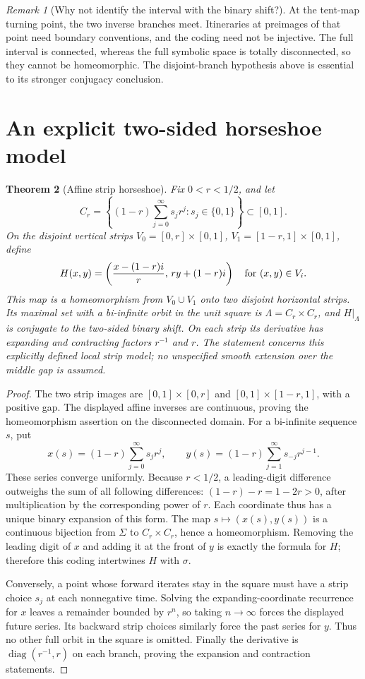 \documentclass[11pt,oneside]{book}
\newtheorem{theorem}{Theorem}[chapter]
\theoremstyle{definition}
\theoremstyle{remark}\newtheorem{remark}[theorem]{Remark}
\begin{document}
\begin{remark}[Why not identify the interval with the binary shift?]
At the tent-map turning point, the two inverse branches meet.
Itineraries at preimages of that point need boundary conventions,
and the coding need not be injective. The full interval is connected,
whereas the full symbolic space is totally disconnected, so they
cannot be homeomorphic. The disjoint-branch hypothesis above is
essential to its stronger conjugacy conclusion.
\end{remark}

\section{An explicit two-sided horseshoe model}

\begin{theorem}[Affine strip horseshoe]\label{d13:17:affine-horseshoe}
Fix \(0<r<1/2\), and let
\[
 C_r=\left\{(1-r)\sum_{j=0}^\infty s_jr^j:
                       s_j\in\{0,1\}\right\}\subset[0,1].
\]
On the disjoint vertical strips
\(V_0=[0,r]\times[0,1]\),
\(V_1=[1-r,1]\times[0,1]\), define
\[
 H(x,y)=\left(\frac{x-(1-r)i}{r},\,ry+(1-r)i\right)
             \quad\hbox{for }(x,y)\in V_i .
\]
This map is a homeomorphism from \(V_0\cup V_1\) onto two disjoint
horizontal strips. Its maximal set with a bi-infinite orbit in the
unit square is \(\Lambda=C_r\times C_r\), and \(H|_\Lambda\) is
conjugate to the two-sided binary shift. On each strip its derivative
has expanding and contracting factors \(r^{-1}\) and \(r\).
The statement concerns this explicitly defined local strip model;
no unspecified smooth extension over the middle gap is assumed.
\end{theorem}
\begin{proof}
The two strip images are
\([0,1]\times[0,r]\) and
\([0,1]\times[1-r,1]\), with a positive gap.
The displayed affine inverses are continuous, proving
the homeomorphism assertion on the disconnected domain.
For a bi-infinite sequence \(s\), put
\[
 x(s)=(1-r)\sum_{j=0}^\infty s_jr^j,\qquad
 y(s)=(1-r)\sum_{j=1}^\infty s_{-j}r^{j-1}.
\]
These series converge uniformly. Because \(r<1/2\), a leading-digit
difference outweighs the sum of all following differences:
\((1-r)-r=1-2r>0\), after multiplication by the corresponding
power of \(r\). Each coordinate thus has a unique binary expansion
of this form. The map \(s\mapsto(x(s),y(s))\) is a continuous bijection
from \(\Sigma\) to \(C_r\times C_r\), hence a homeomorphism.
Removing the leading digit of \(x\) and adding it at the front of
\(y\) is exactly the formula for \(H\); therefore this coding
intertwines \(H\) with \(\sigma\).

Conversely, a point whose forward iterates stay in the square must
have a strip choice \(s_j\) at each nonnegative time. Solving the
expanding-coordinate recurrence for \(x\) leaves a remainder bounded
by \(r^n\), so taking \(n\to\infty\) forces the displayed future
series. Its backward strip choices similarly force the past series
for \(y\). Thus no other full orbit in the square is omitted.
Finally the derivative is \(\operatorname{diag}(r^{-1},r)\) on each
branch, proving the expansion and contraction statements.
\end{proof}
\end{document}
